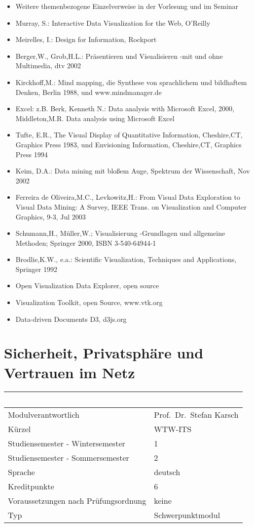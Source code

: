 \begin{itemize}
\item
  Weitere themenbezogene Einzelverweise in der Vorlesung und im Seminar
\item
  Murray, S.: Interactive Data Visualization for the Web, O'Reilly
\item
  Meirelles, I.: Design for Information, Rockport
\item
  Berger,W., Grob,H.L.: Präsentieren und Visualisieren -mit und ohne
  Multimedia, dtv 2002
\item
  Kirckhoff,M.: Mind mapping, die Synthese von sprachlichem und
  bildhaftem Denken, Berlin 1988, und www.mindmanager.de
\item
  Excel: z.B. Berk, Kenneth N.: Data analysis with Microsoft Excel,
  2000, Middleton,M.R. Data analysis using Microsoft Excel
\item
  Tufte, E.R., The Visual Display of Quantitative Information,
  Cheshire,CT, Graphics Press 1983, und Envisioning Information,
  Cheshire,CT, Graphics Press 1994
\item
  Keim, D.A.: Data mining mit bloßem Auge, Spektrum der Wissenschaft,
  Nov 2002
\item
  Ferreira de Oliveira,M.C., Levkowitz,H.: From Visual Data Exploration
  to Visual Data Mining: A Survey, IEEE Trans. on Visualization and
  Computer Graphics, 9-3, Jul 2003
\item
  Schumann,H., Müller,W.; Visualisierung -Grundlagen und allgemeine
  Methoden; Springer 2000, ISBN 3-540-64944-1
\item
  Brodlie,K.W., e.a.: Scientific Visualization, Techniques and
  Applications, Springer 1992
\item
  Open Visualization Data Explorer, open source
\item
  Visualization Toolkit, open Source, www.vtk.org
\item
  Data-driven Documents D3, d3js.org
\end{itemize}

\chapter{Sicherheit, Privatsphäre und Vertrauen im
Netz}\label{sicherheit-privatsphuxe4re-und-vertrauen-im-netz}

\begin{longtable}[]{@{}ll@{}}
\toprule
~ & ~\tabularnewline
\midrule
\endhead
Modulverantwortlich & Prof.~Dr.~Stefan Karsch\tabularnewline
Kürzel & WTW-ITS\tabularnewline
Studiensemester - Wintersemester & 1\tabularnewline
Studiensemester - Sommersemester & 2\tabularnewline
Sprache & deutsch\tabularnewline
Kreditpunkte & 6\tabularnewline
Voraussetzungen nach Prüfungsordnung & keine\tabularnewline
Typ & Schwerpunktmodul\tabularnewline
\bottomrule
\end{longtable}

